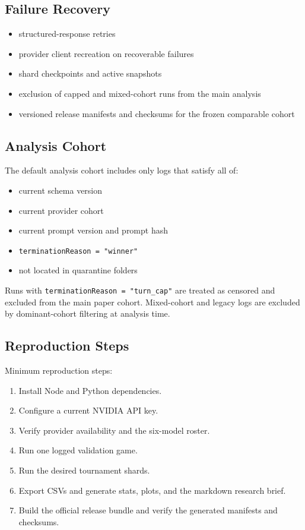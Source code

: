 \subsection{Failure Recovery}

\begin{itemize}[leftmargin=1.25em]
  \item structured-response retries
  \item provider client recreation on recoverable failures
  \item shard checkpoints and active snapshots
  \item exclusion of capped and mixed-cohort runs from the main analysis
  \item versioned release manifests and checksums for the frozen comparable cohort
\end{itemize}

\subsection{Analysis Cohort}

The default analysis cohort includes only logs that satisfy all of:
\begin{itemize}[leftmargin=1.25em]
  \item current schema version
  \item current provider cohort
  \item current prompt version and prompt hash
  \item \texttt{terminationReason = "winner"}
  \item not located in quarantine folders
\end{itemize}

Runs with \texttt{terminationReason = "turn\_cap"} are treated as censored and excluded from the main paper cohort. Mixed-cohort and legacy logs are excluded by dominant-cohort filtering at analysis time.

\subsection{Reproduction Steps}

Minimum reproduction steps:
\begin{enumerate}[leftmargin=1.5em]
  \item Install Node and Python dependencies.
  \item Configure a current NVIDIA API key.
  \item Verify provider availability and the six-model roster.
  \item Run one logged validation game.
  \item Run the desired tournament shards.
  \item Export CSVs and generate stats, plots, and the markdown research brief.
  \item Build the official release bundle and verify the generated manifests and checksums.
\end{enumerate}
